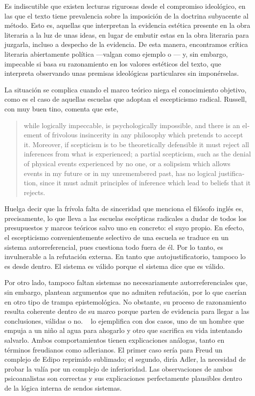 Es indiscutible  que existen lecturas rigurosas desde el compromiso ideológico, en las que el texto tiene prevalencia sobre la imposición de la doctrina subyacente al método. Esto es, aquellas que interpretan la evidencia estética presente en la obra literaria a la luz de unas ideas, en lugar de embutir estas en la obra literaria para juzgarla, incluso a despecho de la evidencia. De esta manera, encontramos crítica literaria abiertamente política —valgan como ejemplo \citeauthor{benjamin1978} o \citeauthor{lukacs2009}— y, sin embargo, impecable si basa su razonamiento en los valores estéticos del texto, que interpreta observando unas premisas ideológicas particulares sin imponérselas.

La situación se complica cuando el marco teórico niega el conocimiento objetivo, como es el caso de aquellas escuelas que adoptan el escepticismo radical. Russell, con muy buen tino, comenta que este,
\blockquote{\begin{english}while logically impeccable, is psychologically impossible, and there is an element of frivolous insincerity in any philosophy which pretends to accept it. Moreover, if scepticism is to be theoretically defensible it must reject all inferences from what is experienced; a partial scepticism, such as the denial of physical events experienced by no one, or a solipsism which allows events in my future or in my unremembered past, has no logical justification, since it must admit principles of inference which lead to beliefs that it rejects.\end{english} \parencite[9]{russell1976}}

Huelga decir que la frívola falta de sinceridad que menciona el filósofo inglés es, precisamente, lo que lleva a las escuelas escépticas radicales a dudar de todos los presupuestos y marcos teóricos salvo uno en concreto: el suyo propio. En efecto, el escepticismo convenientemente selectivo de una escuela se traduce en un sistema autorreferencial, pues cuestiona todo fuera de él. Por lo tanto, es invulnerable a la refutación externa. En tanto que autojustificatorio, tampoco lo es desde dentro. El sistema es válido porque el sistema dice que es válido.

Por otro lado, tampoco faltan sistemas no necesariamente autorreferenciales que, sin embargo, plantean argumentos que no admiten refutación, por lo que caerían en otro tipo de trampa epistemológica. No obstante, su proceso de razonamiento resulta coherente dentro de su marco porque parten de evidencia para llegar a las conclusiones, válidas o no. \citeauthor{popper1989}~\parencite*[35]{popper1989} lo ejemplifica con dos casos, uno de un hombre que empuja a un niño al agua para ahogarlo y otro que sacrifica su vida intentando salvarlo. Ambos comportamientos tienen explicaciones análogas, tanto en términos freudianos como adlerianos. El primer caso sería para Freud un complejo de Edipo reprimido sublimado; el segundo, diría Adler, la necesidad de probar la valía por un complejo de inferioridad. Las observaciones de ambos psicoanalistas son correctas y sus explicaciones perfectamente plausibles dentro de la lógica interna de sendos sistemas.


